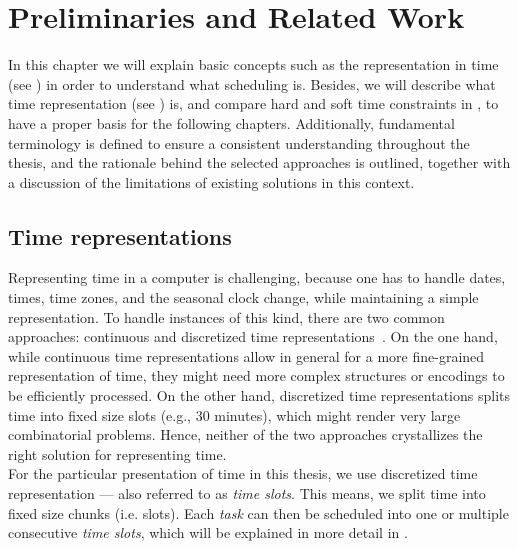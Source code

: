 \cleardoubleoddpage%
\chapter{Preliminaries and Related Work}
\label{chapter:preliminaries-related-work}

In this chapter we will explain basic concepts such as the representation in time (see ) in order to understand what scheduling is. Besides, we will describe what time representation (see ) is, and compare hard and soft time constraints in , to have a proper basis for the following chapters. Additionally, fundamental terminology is defined to ensure a consistent understanding throughout the thesis, and the rationale behind the selected approaches is outlined, together with a discussion of the limitations of existing solutions in this context.

\section{Time representations}
\label{subsec:preliminaries-related-work:time-theory:time-representation}
Representing time in a computer is challenging, because one has to handle dates, times, time zones, and the seasonal clock change, while maintaining a simple representation. To handle instances of this kind, there are two common approaches: continuous and discretized time representations~\cite{bib:2004-floudas}. On the one hand, while continuous time representations allow in general for a more fine-grained representation of time, they might need more complex structures or encodings to be efficiently processed. On the other hand, discretized time representations splits time into fixed size slots (e.g., 30 minutes), which might render very large combinatorial problems. Hence, neither of the two approaches crystallizes the right solution for representing time. \\
For the particular presentation of time in this thesis, we use discretized time representation --- also referred to as \emph{time slots}. This means, we split time into fixed size chunks (i.e. slots). Each \emph{task} can then be scheduled into one or multiple consecutive \emph{time slots}, which will be explained in more detail in .

